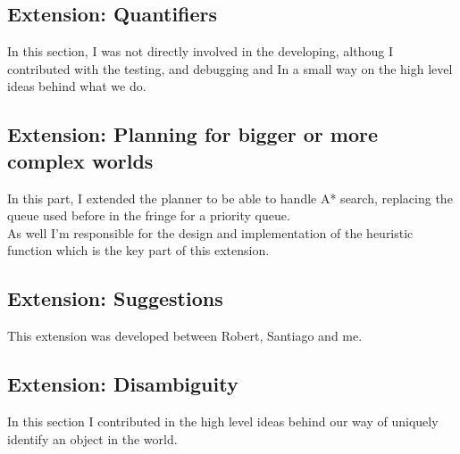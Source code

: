 \documentclass[11pt]{article}
\begin{document}
\subsection{Extension: Quantifiers}
In this section, I was not directly involved in the developing, althoug I 
contributed with the testing, and debugging and In a small way on the high 
level ideas behind what we do.  \\

\subsection{Extension: Planning for bigger or more complex worlds}

In this part, I extended the planner to be able to handle A* search, replacing 
the queue used before in the fringe for a priority queue.  \\

As well I'm responsible for the design and implementation of the heuristic 
function which is the key part of this extension.  \\

\subsection{Extension: Suggestions}

This extension was developed between Robert, Santiago and me.  \\

\subsection{Extension: Disambiguity}

In this section I contributed in the high level ideas behind our way of 
uniquely identify an object in the world.  \\
\end{document}
